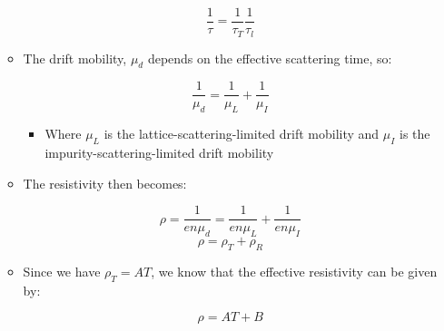 \begin{itemize}
\begin{itemize}
        $$\frac{1}{\tau}=\frac{1}{\tau_T}\frac{1}{\tau_l}$$

      \item The drift mobility, $\mu_d$ depends on the effective scattering time, so:

        $$\frac{1}{\mu_d}=\frac{1}{\mu_L}+\frac{1}{\mu_I}$$

        \begin{itemize}

          \item Where $\mu_L$ is the lattice-scattering-limited drift mobility and $\mu_I$ is the impurity-scattering-limited drift mobility

        \end{itemize}

      \item The resistivity then becomes:

        $$\rho=\frac{1}{en\mu_d}=\frac{1}{en\mu_L}+\frac{1}{en\mu_I}$$
        $$\rho=\rho_T+\rho_R$$

      \item Since we have $\rho_T=AT$, we know that the effective resistivity can be given by:

        $$\rho=AT+B$$

    \end{itemize}

\end{itemize}



